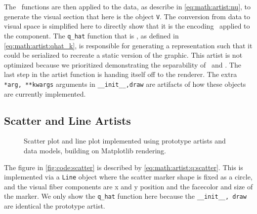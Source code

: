 \documentclass[journal]{vgtc}                %
\begin{document}
 The \vchannel\ functions are then applied to the data, as describe in \autoref{eq:math:artist:nu}, to generate the visual section \vsection that here is the object \texttt{V}. The conversion from data to visual space is simplified here to directly show that it is the encoding \vchannel\ applied to the component. The \texttt{q_hat} function that is \vmarkd,  as defined in \autoref{eq:math:artist:qhat_k}, is responsible for generating a representation such that it could be serialized to recreate a static version of the graphic. This artist is not optimized because we prioritized demonstrating the separability of \vchannel\ and \vmarkd. The last step in the artist function is handing itself off to the renderer. The extra \texttt{*arg, **kwargs} arguments in \texttt{__init__,draw} are artifacts of how these objects are currently implemented.

 \subsection{Scatter and Line Artists}
 \begin{figure}[H]
    \centering 
  \caption{Scatter plot and line plot implemented using prototype artists and data models, building on Matplotlib rendering.}
  \label{fig:code_scatter_line}
\end{figure}
The figure in \autoref{fig:code:scatter} is described by \autoref{eq:math:artist:q:scatter}. This is implemented via a \texttt{Line} object where the scatter marker shape is fixed as a circle, and the visual fiber components are x and y position and the facecolor and size of the marker. We only show the \texttt{q_hat} function here because the \texttt{__init__, draw} are identical the prototype artist. 
\end{document}
